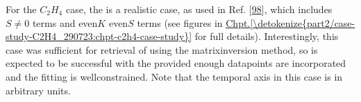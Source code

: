 \documentclass[letterpaper,table,10pt,english]{jupyterBook}
\begin{document}
\sphinxAtStartPar
For the \(C_2H_4\) case, the {\hyperref[\detokenize{backmatter/glossary:term-RWP}]{}} is a realistic case, as used in Ref. {[}\hyperlink{cite.backmatter/bibliography:id636}{98}{]}, which includes \(S\neq0\) terms and even\sphinxhyphen{}\(K\) even\sphinxhyphen{}\(S\) terms (see figures in \hyperref[\detokenize{part2/case-study-C2H4_290723:chpt-c2h4-case-study}]{Chpt.\@ \ref{\detokenize{part2/case-study-C2H4_290723:chpt-c2h4-case-study}}} for full details). Interestingly, this case was sufficient for retrieval of {\hyperref[\detokenize{backmatter/glossary:term-MF}]{}} using the matrix\sphinxhyphen{}inversion method, so is expected to be successful with the {\hyperref[\detokenize{backmatter/glossary:term-bootstrap-retrieval-protocol}]{}} provided enough data\sphinxhyphen{}points are incorporated and the fitting is well\sphinxhyphen{}constrained. Note that the temporal axis in this case is in arbitrary units.
\end{document}
